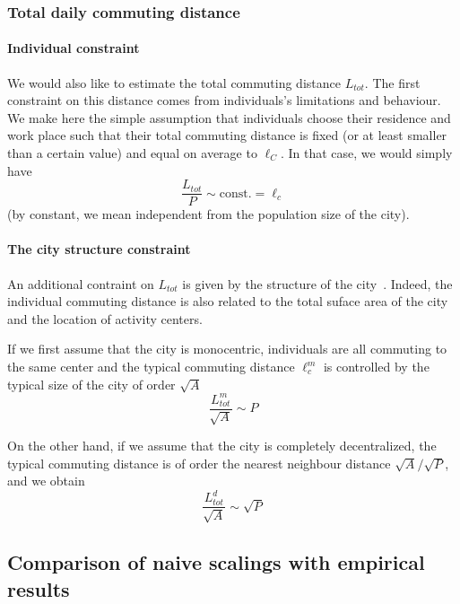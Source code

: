 
\subsubsection{Total daily commuting distance} 

\paragraph{Individual constraint} We would also like to estimate the total commuting distance $L_{tot}$. The first constraint on this distance comes from individuals's limitations and behaviour. We make here the simple assumption that individuals choose their residence and work place such that their total commuting distance is fixed (or at least smaller than a certain value) and equal on average to $\ell_C$. In that case, we would simply have
%
\begin{equation}
  \frac{L_{tot}}{P} \sim \text{const.} = \ell_c
\label{eq:assum}
\end{equation}
(by constant, we mean independent from the population size of the city).

\paragraph{The city structure constraint} An additional contraint on $L_{tot}$ is given by the structure of the city~\cite{Samaniego:2008}. Indeed, the individual commuting distance is also related to the total suface area of the city and the location of activity centers.

If we first assume that the city is monocentric, individuals are all commuting to the same center and the typical commuting distance $\ell^m_c$ is controlled by the typical size of the city of order $\sqrt{A}$ 
%
\begin{equation}
\frac{L_{tot}^{m}}{\sqrt{A}} \sim P
\end{equation}

On the other hand, if we assume that the city is completely decentralized, the typical commuting distance is of order the nearest neighbour distance $\sqrt{A}/\sqrt{P}$, and we obtain
%
\begin{equation}
\frac{L_{tot}^{d}}{\sqrt{A}} \sim \sqrt{P}
\end{equation}


\subsection{Comparison of naive scalings with empirical results}

